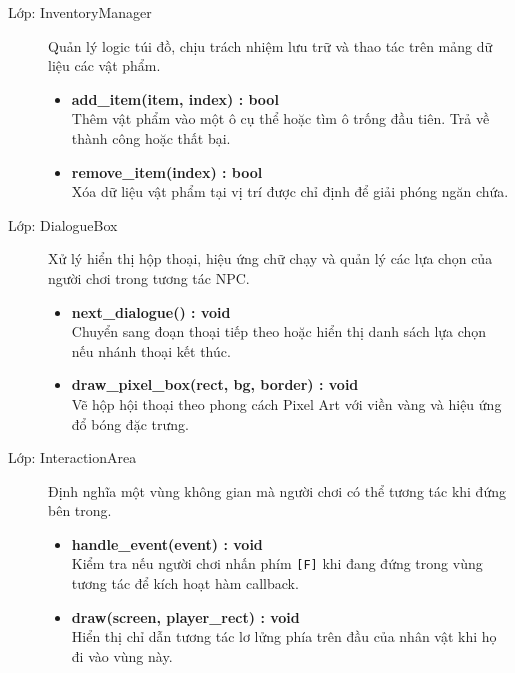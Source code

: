 \begin{description}
    \item[Lớp: InventoryManager]
    Quản lý logic túi đồ, chịu trách nhiệm lưu trữ và thao tác trên mảng dữ liệu các vật phẩm.
    \begin{itemize}
        \item \textbf{add\_item(item, index) : bool} \\
        Thêm vật phẩm vào một ô cụ thể hoặc tìm ô trống đầu tiên. Trả về thành công hoặc thất bại.
        \item \textbf{remove\_item(index) : bool} \\
        Xóa dữ liệu vật phẩm tại vị trí được chỉ định để giải phóng ngăn chứa.
    \end{itemize}

    \item[Lớp: DialogueBox]
    Xử lý hiển thị hộp thoại, hiệu ứng chữ chạy và quản lý các lựa chọn của người chơi trong tương tác NPC.
    \begin{itemize}
        \item \textbf{next\_dialogue() : void} \\
        Chuyển sang đoạn thoại tiếp theo hoặc hiển thị danh sách lựa chọn nếu nhánh thoại kết thúc.
        \item \textbf{draw\_pixel\_box(rect, bg, border) : void} \\
        Vẽ hộp hội thoại theo phong cách Pixel Art với viền vàng và hiệu ứng đổ bóng đặc trưng.
    \end{itemize}

    \item[Lớp: InteractionArea]
    Định nghĩa một vùng không gian mà người chơi có thể tương tác khi đứng bên trong.
    \begin{itemize}
        \item \textbf{handle\_event(event) : void} \\
        Kiểm tra nếu người chơi nhấn phím \texttt{[F]} khi đang đứng trong vùng tương tác để kích hoạt hàm callback.
        \item \textbf{draw(screen, player\_rect) : void} \\
        Hiển thị chỉ dẫn tương tác lơ lửng phía trên đầu của nhân vật khi họ đi vào vùng này.
    \end{itemize}

\end{description}